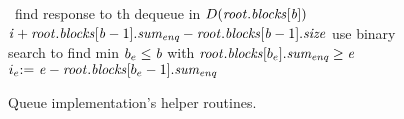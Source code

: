 \begin{figure*}
\begin{algorithmic}[1]
 \com\ find response to th dequeue in $D(\var{root}.\fld{blocks}[\var{b}])$
    \State {}
    \State {}\label{FRNum}
    \label{checkEmpty}
        \State \Return \nl \hfill {}\label{returnNull}
    \Else \ 
        \State {} \assign\ $\var{i} + \var{root}.\fld{blocks}[\var{b}-1].\fld{sum\sub{enq}} - 
			\var{root}.\fld{blocks}[\var{b}-1].\size$ \label{computeE}
		\State use binary search to find min $b_e\leq \var{b}$ with $\var{root}.\fld{blocks}[b_e].\fld{sum\sub{enq}} \geq \var{e}$\label{FRb}
		\State $i_e \assign\ \var{e} - \var{root}.\fld{blocks}[b_e-1].\fld{sum\sub{enq}}$\label{FRi}
        \State \Return {}\label{findAnswer}
    \EndIf
{}
\end{algorithmic}
\caption{Queue implementation's helper routines. \label{code2}}
\end{figure*}

